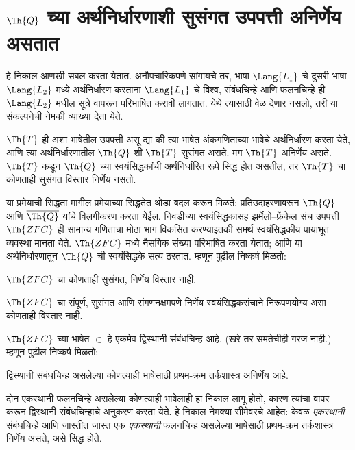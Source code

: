 \section[Q च्या अर्थनिर्धारणाशी सुसंगत उपपत्ती अनिर्णेय असतात]{$\Th{Q}$ च्या अर्थनिर्धारणाशी सुसंगत उपपत्ती अनिर्णेय असतात}\label{inc:tcp:itp:sec}

हे निकाल आणखी सबल करता येतात. अनौपचारिकपणे सांगायचे तर,
भाषा $\Lang{L_1}$ चे दुसरी भाषा $\Lang{L_2}$ मध्ये
अर्थनिर्धारण करताना $\Lang{L_1}$ चे विश्व, संबंधचिन्हे आणि
फलनचिन्हे ही $\Lang{L_2}$ मधील सूत्रे वापरून
परिभाषित करावी लागतात. येथे त्यासाठी वेळ देणार नसलो,
तरी या संकल्पनेची नेमकी व्याख्या देता येते.

\begin{thm}
  $\Th{T}$ ही अशा भाषेतील उपपत्ती असू द्या की त्या भाषेत
  अंकगणिताच्या भाषेचे अर्थनिर्धारण करता येते, आणि त्या
  अर्थनिर्धारणातील $\Th{Q}$ शी $\Th{T}$ सुसंगत असते.
  मग $\Th{T}$ अनिर्णेय असते. $\Th{T}$ कडून $\Th{Q}$ च्या
  स्वयंसिद्धकांची अर्थनिर्धारित रूपे सिद्ध होत असतील, तर
  $\Th{T}$ चा कोणताही सुसंगत विस्तार निर्णेय नसतो.
\end{thm}

या प्रमेयाची सिद्धता मागील प्रमेयाच्या सिद्धतेत थोडा बदल करून
मिळते; प्रतिउदाहरणावरून $\Th{Q}$ आणि $\overline{\Th{Q}}$ यांचे
विलगीकरण करता येईल. निवडीच्या स्वयंसिद्धकासह
झर्मेलो--फ्रेंकेल संच उपपत्ती $\Th{ZFC}$ ही सामान्य
गणिताचा मोठा भाग विकसित करण्याइतकी समर्थ स्वयंसिद्धकीय
पायाभूत व्यवस्था मानता येते. $\Th{ZFC}$ मध्ये नैसर्गिक
संख्या परिभाषित करता येतात; आणि या अर्थनिर्धारणातून
$\Th{Q}$ ची स्वयंसिद्धके सत्य ठरतात. म्हणून पुढील निष्कर्ष मिळतो:

\begin{cor}
$\Th{ZFC}$ चा कोणताही सुसंगत, निर्णेय विस्तार नाही.
\end{cor}

\begin{cor}
$\Th{ZFC}$ चा संपूर्ण, सुसंगत आणि संगणनक्षमपणे
निर्णेय स्वयंसिद्धकसंचाने निरूपणयोग्य असा कोणताही विस्तार नाही.
\end{cor}

$\Th{ZFC}$ च्या भाषेत $\in$ हे एकमेव द्विस्थानी संबंधचिन्ह
आहे. (खरे तर समतेचीही गरज नाही.) म्हणून पुढील निष्कर्ष मिळतो:

\begin{cor}
द्विस्थानी संबंधचिन्ह असलेल्या कोणत्याही भाषेसाठी प्रथम-क्रम
तर्कशास्त्र अनिर्णेय आहे.
\end{cor}

दोन एकस्थानी फलनचिन्हे असलेल्या कोणत्याही भाषेलाही हा निकाल
लागू होतो, कारण त्यांचा वापर करून द्विस्थानी संबंधचिन्हाचे
अनुकरण करता येते. हे निकाल नेमक्या सीमेवरचे आहेत: केवळ
\emph{एकस्थानी} संबंधचिन्हे आणि जास्तीत जास्त एक
\emph{एकस्थानी} फलनचिन्ह असलेल्या भाषेसाठी प्रथम-क्रम
तर्कशास्त्र निर्णेय असते, असे सिद्ध होते.

